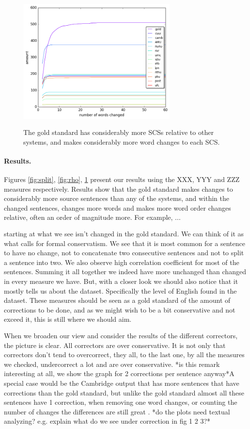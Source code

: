 \documentclass[english]{article}
\begin{document}
\begin{figure}
	\includegraphics[width = 8cm]{words_differences}
	\label{fig:words_changed}
        \caption{The gold standard has considerably more SCSs relative to other systems,
          and makes considerably more word changes to each SCS.}
\end{figure}

\paragraph{Results.}
Figures \ref{fig:split}, \ref{fig:rho}, \ref{fig:words_changed} present our results using the XXX, YYY and ZZZ
measures respectively. Results show that the gold standard
makes changes to considerably more source sentences than any of the systems, and within the changed
sentences, changes more words and makes more word order changes relative, often an order of magnitude
more. For example, ... %

starting at what we see isn't changed in the gold standard. We can think of it as what calls for formal conservatism.
We see that it is most common for a sentence to have
no change, not to concatenate two consecutive sentences and not to
split a sentence into two. We also observe high correlation coefficient
for most of the sentences. Summing it all together we indeed have
more unchanged than changed in every measure we have. But, with a
closer look we should also notice that it mostly tells us about the
dataset. Specifically the level of English found in the dataset.
These measures should be seen as a gold standard of the amount of
corrections to be done, and as we might wish to be a bit conservative
and not exceed it, this is still where we should aim.

When we broaden our view and consider the results of the different
correctors, the picture is clear. All correctors are over conservative.
It is not only that correctors don't tend to overcorrect, they all,
to the last one, by all the measures we checked, undercorrect a lot
and are over conservative. {*}is this remark interesting at all, we show the graph for 2 corrections per sentence anyway{*}A special case would be the Cambridge output that has more sentences that have corrections than the gold standard, but unlike the gold standard almost all these sentences have 1 correction, when removing one word changes, or counting the number of changes the differences are still great . {*}do the plots need textual analyzing? e.g. explain what do we see under correction in fig 1 2 3?{*}
\end{document}
